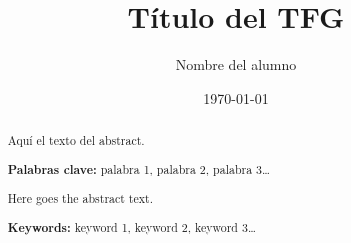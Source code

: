 \documentclass[a4paper, 12pt]{report} %
\author{Nombre del alumno}
\date{\today}
\title{Título del TFG}
\begin{document}

    \maketitle
    \tableofcontents
    \listoffigures
    \listoftables

    \begin{abstract}
      \normalsize
      Aquí el texto del abstract.

      \textbf{Palabras clave:} palabra 1, palabra 2, palabra 3\ldots
    \end{abstract}

    \begin{otherlanguage}{english}
      \begin{abstract}
        \normalsize
        Here goes the abstract text.

        \textbf{Keywords:} keyword 1, keyword 2, keyword 3\ldots
      \end{abstract}
    \end{otherlanguage}
    \newpage


    
    
    
    
    
    

    \printbibliography[heading=bibnumbered] %


\appendix

\end{document}
